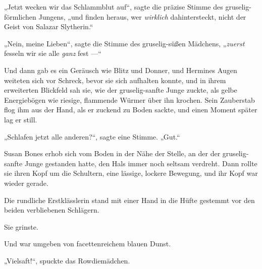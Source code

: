 „Jetzt wecken wir das Schlammblut auf“, sagte die präzise Stimme des gruselig-förmlichen Jungens, „und finden heraus, wer \emph{wirklich} dahintersteckt, nicht der Geist von Salazar Slytherin.“

„Nein, meine Lieben“, sagte die Stimme des gruselig-süßen Mädchens,
„\emph{zuerst} fesseln wir sie alle \emph{ganz} fest —“

Und dann gab es ein Geräusch wie Blitz und Donner, und Hermines Augen weiteten sich vor Schreck, bevor sie sich aufhalten konnte, und in ihrem erweiterten Blickfeld sah sie, wie der gruselig-sanfte Junge zuckte, als gelbe Energiebögen wie riesige, flammende Würmer über ihn krochen. Sein Zauberstab flog ihm aus der Hand, als er zuckend zu Boden sackte, und einen Moment später lag er still.

„Schlafen jetzt alle anderen?“, sagte eine Stimme.
„Gut.“

Susan Bones erhob sich vom Boden in der Nähe der Stelle, an der der gruselig-sanfte Junge gestanden hatte, den Hals immer noch seltsam verdreht. Dann rollte sie ihren Kopf um die Schultern, eine lässige, lockere Bewegung, und ihr Kopf war wieder gerade.

Die rundliche Erstklässlerin stand mit einer Hand in die Hüfte gestemmt vor den beiden verbliebenen Schlägern.

Sie grinste.

Und war umgeben von facettenreichem blauen Dunst.

„Vielsaft!“, spuckte das Rowdiemädchen.

